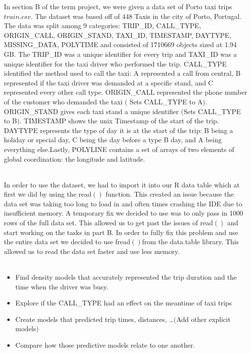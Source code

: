 \documentclass[11pt]{article}
\begin{document}
\par
	In section B of the term project, we were given a data set of Porto taxi trips \(train.csv\).
 The dataset was based off of 448 Taxis in the city of Porto, Portugal. The data was split among 9
 categories: TRIP\_ID, CALL\_TYPE, ORIGIN\_CALL, ORIGIN\_STAND, TAXI\_ID, TIMESTAMP, DAYTYPE, MISSING\_DATA,
 POLYTIME and consisted of 1710669 objects sized at 1.94 GB. The TRIP\_ID was a unique identifier for
 every trip and TAXI\_ID was a unique identifier for the taxi driver who performed the trip. CALL\_TYPE
 identified the method used to call the taxi: \textsc{}A\textsc{} represented a call from central,
 \textsc{}B\textsc{} represented if the taxi driver was demanded at a specific stand, and 
 \textsc{}C\textsc{} represented every other call type. ORIGIN\_CALL represented the phone number of the customer who
 demanded the taxi $($ Sets CALL\_TYPE to \textsc{}A\textsc{}$)$. ORIGIN\_STAND gives each taxi
 stand a unique identifier $($Sets CALL\_TYPE to \textsc{}B\textsc{}$)$. TIMESTAMP shows the unix
 Timestamp of the start of the trip. DAYTYPE represents the type of day it is at the start of the trip: \textsc{}B
 \textsc{} being a holiday or special day, \textsc{}C\textsc{} being the day before a type
 \textsc{}B\textsc{} day, and \textsc{}A\textsc{} being everything else.Lastly,
 POLYLINE contains a set of arrays of two elements of global coordination: the longitude and latitude.\\

\\
\par
	 In order to use the dataset, we had to import it into our R data table which at first we did by using the read$()$
 function. This created an issue because the data set was taking too long to load in and often times crashing the
 IDE due to insufficient memory. A temporary fix we decided to use was to only pass in 1000 rows of the full data 
 set. This allowed us to get past the issues of read$()$ and start working on the tasks in part B. In order to fully
 fix this problem and use the entire data set we decided to use fread$()$from the data.table library. This allowed
 us to read the data set faster and use less memory.\\

\\
\begin{itemize}
	\item Find density models that accurately represented the trip duration and the time when the driver was busy.
	\item Explore if the CALL\_TYPE had an effect on the meantime of taxi trips
	\item Create models that predicted trip times, distances, …$($Add other explicit models$)$
	\item Compare how those predictive models relate to one another.
\end{itemize}
\end{document}
